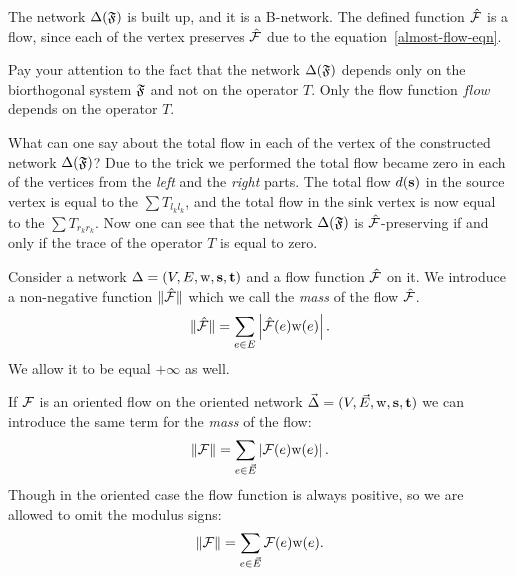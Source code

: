 \documentclass[12pt]{amsart}
\begin{document}
    The network $\Delta(\mathfrak{F})$ is built up, and it is a B-network.
    The defined function $\mathcal{\hat{F}}$ is a flow, since each of the vertex preserves
      $\mathcal{\hat{F}}$ due to the equation~\eqref{almost-flow-eqn}.
    \begin{remark}
      Pay your attention to the fact that the network $\Delta(\mathfrak{F})$
        depends only on the biorthogonal system $\mathfrak{F}$ and not on the operator $T$.
      Only the flow function $flow$ depends on the operator $T$.
    \end{remark}
    What can one say about the total flow in each of the vertex of the constructed network $\Delta(\mathfrak{F})$?
    Due to the trick we performed the total flow became zero in each of the vertices from the \emph{left} and the \emph{right} parts.
    The total flow $d(\mathbf{s})$ in the source vertex is equal to the $\sum T_{l_k l_k}$, and the total flow in the
      sink vertex is now equal to the $\sum T_{r_k r_k}$.
    Now one can see that the network $\Delta(\mathfrak{F})$ is $\mathcal{\hat{F}}$-preserving if and only if the trace of the operator $T$ is equal to
      zero.
    \begin{definition}
      Consider a network $\Delta = (V, E, \mathrm{w}, \mathbf{s}, \mathbf{t})$ and a flow function $\mathcal{\hat{F}}$ on it.
      We introduce a non-negative function $\|\mathcal{\hat{F}}\|$ which we call the \emph{mass} of the flow $\mathcal{\hat{F}}$.
      \[
        \|\mathcal{\hat{F}}\| = \sum_{e \in E} \left|\mathcal{\hat{F}}(e) \mathrm{w}(e)\right|.
      \]
      We allow it to be equal $+\infty$ as well.
    \end{definition}
    \begin{definition}
      If $\mathcal{F}$ is an oriented flow on the oriented network $\vec{\Delta} = (V,\vec{E},\mathrm{w}, \mathbf{s}, \mathbf{t})$ 
        we can introduce the same term for the \emph{mass} of the flow:
      \[
        \|\mathcal{F}\| = \sum_{e \in \vec{E}} \left|\mathcal{F}(e) \mathrm{w}(e)\right|.
      \]
      Though in the oriented case the flow function is always positive,
        so we are allowed to omit the modulus signs:
      \[
        \|\mathcal{F}\| = \sum_{e \in \vec{E}} \mathcal{F}(e) \mathrm{w}(e).
      \]
    \end{definition}
\end{document}
